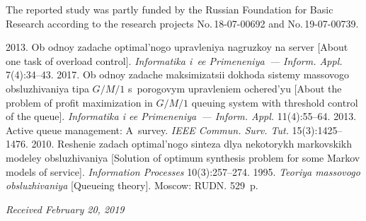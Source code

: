 

  
  



\Ack
\noindent
The reported study was partly funded by the Russian Foundation for Basic Research 
according to the research projects 
No.\,18-07-00692 and No.\,19-07-00739.



  \begin{multicols}{2}

\renewcommand{\bibname}{\protect\rmfamily References}

{\small\frenchspacing
 {%
 \begin{thebibliography}{9}
 2013. Ob odnoy zadache optimal'nogo upravleniya 
nagruzkoy na server [About one task of overload control]. \textit{Informatika i~ee 
Primeneniya~--- Inform. Appl.} 7(4):34--43.
 2017. Ob odnoy zadache 
maksimizatsii dokhoda sistemy massovogo obsluzhivaniya tipa $G/M/1$ s~porogovym upravleniem ochered'yu  
[About the problem of profit maximization in $G/M/1$ queuing system 
with threshold control of the queue]. \textit{Informatika i ee Primeneniya~--- Inform. Appl.} 
11(4):55--64.
 2013. Active queue management: A~survey. \textit{IEEE 
Commun. Surv.  Tut.} 15(3):1425--1476.
 2010. Reshenie zadach optimal'nogo sinteza dlya 
nekotorykh markovskikh modeley obsluzhivaniya [Solution of optimum synthesis 
problem for some Markov models of service]. \textit{Information Processes} 10(3):257--274.
 1995. \textit{Teoriya massovogo 
obsluzhivaniya} [Queueing theory]. Moscow: RUDN. 529~p.
\end{thebibliography}

 }
 }

\end{multicols}

\vspace*{-6pt}

\hfill{\small\textit{Received February 20, 2019}}

